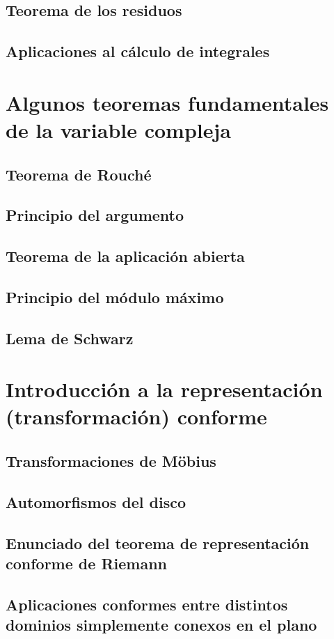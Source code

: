 \documentclass{apuntes}
\begin{document}
\section{Teorema de los residuos}
\section{Aplicaciones al cálculo de integrales}


\chapter{Algunos teoremas fundamentales de la variable compleja}
\section{Teorema de Rouché}
\section{Principio del argumento}
\section{Teorema de la aplicación abierta}
\section{Principio del módulo máximo}
\section{Lema de Schwarz}


\chapter{Introducción a la representación (transformación) conforme}
\section{Transformaciones de Möbius}
\section{Automorfismos del disco}
\section{Enunciado del teorema de representación conforme de Riemann}
\section{Aplicaciones conformes entre distintos dominios simplemente conexos en el plano}


\appendix


\printindex
\end{document}
